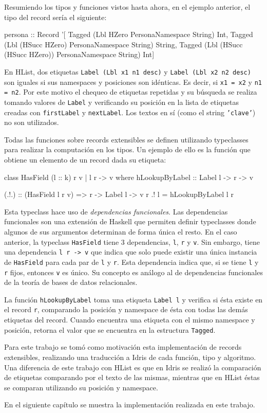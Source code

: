 Resumiendo los tipos y funciones vistos hasta ahora, en el ejemplo anterior, el tipo del record sería el siguiente:

\begin{code}
persona :: Record '[
  Tagged (Lbl HZero 
    PersonaNamespace String) Int,
  Tagged (Lbl (HSucc HZero) 
    PersonaNamespace String) String,
  Tagged (Lbl (HSucc (HSucc HZero)) 
    PersonaNamespace String) Int]
\end{code}

En HList, dos etiquetas \texttt{Label (Lbl x1 n1 desc)} y \texttt{Label (Lbl x2 n2 desc)} son iguales si sus namespaces y posiciones son idénticas. Es decir, si \texttt{x1 = x2} y \texttt{n1 = n2}. Por este motivo el chequeo de etiquetas repetidas y su búsqueda se realiza tomando valores de \texttt{Label} y verificando su posición en la lista de etiquetas creadas con \texttt{firstLabel} y \texttt{nextLabel}. Los textos en sí (como el string \texttt{'clave'}) no son utilizados.

Todas las funciones sobre records extensibles se definen utilizando typeclasses para realizar la computación en los tipos. Un ejemplo de ello es la función que obtiene un elemento de un record dada su etiqueta:

\begin{code}
class HasField (l :: k) r v | l r -> v where
  hLookupByLabel :: Label l -> r -> v

(.!.) :: (HasField l r v) => r -> Label l -> v
r .! l = hLookupByLabel l r
\end{code}

Esta typeclass hace uso de \textit{dependencias funcionales}. Las dependencias funcionales son una extensión de Haskell que permiten definir typeclasses donde algunos de sus argumentos determinan de forma única el resto. En el caso anterior, la typeclass \texttt{HasField} tiene 3 dependencias, \texttt{l}, \texttt{r} y \texttt{v}. Sin embargo, tiene una dependencia \texttt{l r -> v} que indica que solo puede existir una única instancia de \texttt{HasField} para cada par de \texttt{l} y \texttt{r}. Esta dependencia indica que, si se tiene \texttt{l} y \texttt{r} fijos, entonces \texttt{v} es único. Su concepto es análogo al de dependencias funcionales de la teoría de bases de datos relacionales.

La función \texttt{hLookupByLabel} toma una etiqueta \texttt{Label l} y verifica si ésta existe en el record \texttt{r}, comparando la posición y namespace de ésta con todas las demás etiquetas del record. Cuando encuentra una etiqueta con el mismo namespace y posición, retorna el valor que se encuentra en la estructura \texttt{Tagged}.

Para este trabajo se tomó como motivación esta implementación de records extensibles, realizando una traducción a Idris de cada función, tipo y algoritmo. Una diferencia de este trabajo con HList es que en Idris se realizó la comparación de etiquetas comparando por el texto de las mismas, mientras que en HList éstas se comparan utilizando su posición y namespace.

En el siguiente capítulo se muestra la implementación realizada en este trabajo.
